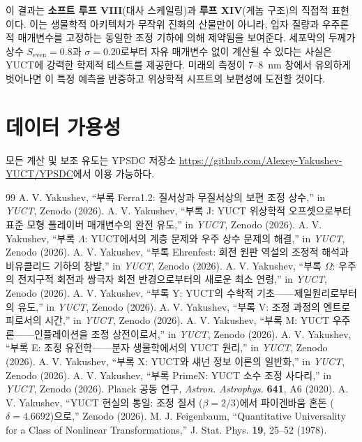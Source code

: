 \documentclass[12pt,a4paper]{article}
\begin{document}
	이 결과는 \textbf{소프트 루프 VIII}(대사 스케일링)과 \textbf{루프 XIV}(게놈 구조)의 직접적 표현이다. 이는 생물학적 아키텍처가 무작위 진화의 산물만이 아니라, 입자 질량과 우주론적 매개변수를 고정하는 동일한 조정 기하에 의해 제약됨을 보여준다. 세포막의 두께가 상수 \(S_{\mathrm{even}} = 0.8\)과 \(\sigma = 0.20\)로부터 자유 매개변수 없이 계산될 수 있다는 사실은 YUCT에 강력한 학제적 테스트를 제공한다. 미래의 측정이 7–8~nm 창에서 유의하게 벗어나면 이 특정 예측을 반증하고 위상학적 시프트의 보편성에 도전할 것이다.
	
	\section*{데이터 가용성}
	모든 계산 및 보조 유도는 YPSDC 저장소 \url{https://github.com/Alexey-Yakushev-YUCT/YPSDC}에서 이용 가능하다.
	
	\begin{thebibliography}{99}
		 A. V. Yakushev, ``부록 Ferra1.2: 질서상과 무질서상의 보편 조정 상수,'' in \emph{YUCT}, Zenodo (2026).
		 A. V. Yakushev, ``부록 J: YUCT 위상학적 오프셋으로부터 표준 모형 플레이버 매개변수의 완전 유도,'' in \emph{YUCT}, Zenodo (2026).
		 A. V. Yakushev, ``부록 \(\Lambda\): YUCT에서의 계층 문제와 우주 상수 문제의 해결,'' in \emph{YUCT}, Zenodo (2026).
		 A. V. Yakushev, ``부록 Ehrenfest: 회전 원판 역설의 조정적 해석과 비유클리드 기하의 창발,'' in \emph{YUCT}, Zenodo (2026).
		 A. V. Yakushev, ``부록 \(\Omega\): 우주의 전지구적 회전과 쌍극자 회전 반경으로부터의 새로운 최소 연령,'' in \emph{YUCT}, Zenodo (2026).
		 A. V. Yakushev, ``부록 Y: YUCT의 수학적 기초——제일원리로부터의 유도,'' in \emph{YUCT}, Zenodo (2026).
		 A. V. Yakushev, ``부록 V: 조정 과정의 엔트로피로서의 시간,'' in \emph{YUCT}, Zenodo (2026).
		 A. V. Yakushev, ``부록 M: YUCT 우주론——인플레이션을 조정 상전이로서,'' in \emph{YUCT}, Zenodo (2026).
		 A. V. Yakushev, ``부록 E: 조정 유전학——분자 생물학에서의 YUCT 원리,'' in \emph{YUCT}, Zenodo (2026).
		 A. V. Yakushev, ``부록 X: YUCT와 섀넌 정보 이론의 일반화,'' in \emph{YUCT}, Zenodo (2026).
		 A. V. Yakushev, ``부록 PrimeN: YUCT 소수 조정 사다리,'' in \emph{YUCT}, Zenodo (2026).
		 Planck 공동 연구, \emph{Astron. Astrophys.} \textbf{641}, A6 (2020).
		 A. V. Yakushev, ``YUCT 현실의 통일: 조정 질서 (\(\beta = 2/3\))에서 파이겐바움 혼돈 (\(\delta = 4.6692\))으로,'' Zenodo (2026).
		 M. J. Feigenbaum, ``Quantitative Universality for a Class of Nonlinear Transformations,'' J. Stat. Phys. \textbf{19}, 25–52 (1978).
	\end{thebibliography}
	
\end{document}
